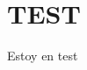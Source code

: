 \documentclass[
	spanish, %
	letterpaper, oneside
]{article}
\begin{document}
\templatePortrait

\templatePagecfg

\begin{abstractd}
	\lipsum[1] %
\end{abstractd}

\templateIndex

\templateFinalcfg


\section{TEST}
Estoy en test


\end{document}
